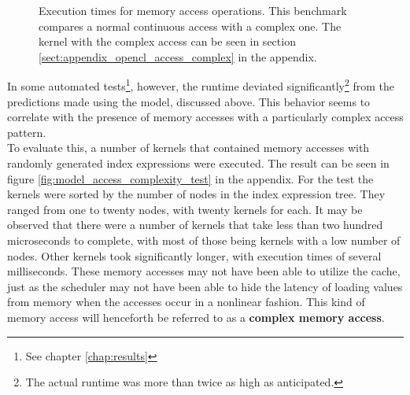 \begin{figure}[hbp]
	\begin{center}
		\caption{Execution times for memory access operations. This benchmark compares a normal continuous access with a complex one. The kernel with the complex access can be seen in section \ref{sect:appendix_opencl_access_complex} in the appendix.}
		\label{fig:model_access_single_complex}
	\end{center}
\end{figure}

In some automated tests\footnote{See chapter \ref{chap:results}}, however, the runtime deviated significantly\footnote{The actual runtime was more than twice as high as anticipated.} from the predictions made using the model, discussed above. This behavior seems to correlate with the presence of memory accesses with a particularly complex access pattern. \\

To evaluate this, a number of kernels that contained memory accesses with randomly generated index expressions were executed. The result can be seen in figure \ref{fig:model_access_complexity_test} in the appendix. For the test the kernels were sorted by the number of nodes in the index expression tree. They ranged from one to twenty nodes, with twenty kernels for each. It may be observed that there were a number of kernels that take less than two hundred microseconds to complete, with most of those being kernels with a low number of nodes. Other kernels took significantly longer, with execution times of several milliseconds. These memory accesses may not have been able to utilize the cache, just as the scheduler may not have been able to hide the latency of loading values from memory when the accesses occur in a nonlinear fashion. This kind of memory access will henceforth be referred to as a \textbf{complex memory access}.

